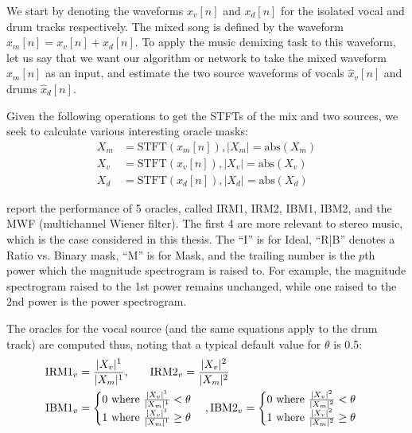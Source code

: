 \documentclass[report.tex]{subfiles}
\begin{document}
We start by denoting the waveforms $x_{v}[n]$ and $x_{d}[n]$ for the isolated vocal and drum tracks respectively. The mixed song is defined by the waveform $x_{m}[n] = x_{v}[n] + x_{d}[n]$. To apply the music demixing task to this waveform, let us say that we want our algorithm or network to take the mixed waveform $x_{m}[n]$ as an input, and estimate the two source waveforms of vocals $\hat{x}_{v}[n]$ and drums $\hat{x}_{d}[n]$.

Given the following operations to get the STFTs of the mix and two sources, we seek to calculate various interesting oracle masks:
\begin{align}
	\nonumber X_{m} &= \text{STFT}(x_{m}[n]), |X_{m}| = \text{abs}(X_{m})\\
	\nonumber X_{v} &= \text{STFT}(x_{v}[n]), |X_{v}| = \text{abs}(X_{v})\\
	\nonumber X_{d} &= \text{STFT}(x_{d}[n]), |X_{d}| = \text{abs}(X_{d})
\end{align}
 
\textcite{sisec2018} report the performance of 5 oracles, called IRM1, IRM2, IBM1, IBM2, and the MWF (multichannel Wiener filter). The first 4 are more relevant to stereo music, which is the case considered in this thesis. The ``I'' is for Ideal, ``R|B'' denotes a Ratio vs. Binary mask, ``M'' is for Mask, and the trailing number is the $p$th power which the magnitude spectrogram is raised to. For example, the magnitude spectrogram raised to the 1st power remains unchanged, while one raised to the 2nd power is the power spectrogram.

The oracles for the vocal source (and the same equations apply to the drum track) are computed thus, noting that a typical default value for $\theta$ is 0.5:
\begin{align}
	\nonumber \text{IRM1}_{v} &= \frac{|X_{v}|^{1}}{|X_{m}|^{1}}\text{,\qquad}
	\nonumber \text{IRM2}_{v} = \frac{|X_{v}|^{2}}{|X_{m}|^{2}}\\
	\nonumber \text{IBM1}_{v} &= \begin{cases}
		0 \text{ where } \frac{|X_{v}|^{1}}{|X_{m}|^{1}} < \theta\\
		1 \text{ where } \frac{|X_{v}|^{1}}{|X_{m}|^{1}} \ge \theta
	\end{cases},
	\nonumber \text{IBM2}_{v} = \begin{cases}
		0 \text{ where } \frac{|X_{v}|^{2}}{|X_{m}|^{2}} < \theta\\
		1 \text{ where } \frac{|X_{v}|^{2}}{|X_{m}|^{2}} \ge \theta
	\end{cases}
\end{align}
\end{document}
